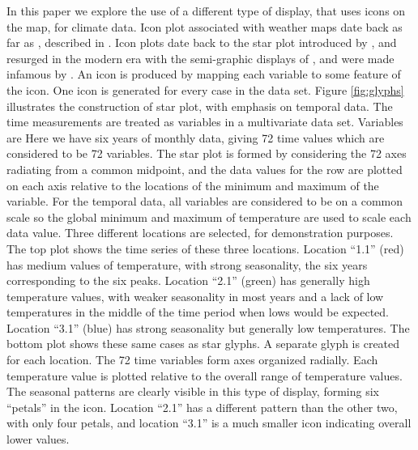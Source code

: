 \documentclass[oneside]{article}
\begin{document}
In this paper we explore the use of a different type of display, that uses icons on the map, for climate data.  Icon plot associated with weather maps date back as far as \citet{galton:weathermap}, described in \citet{friendlydenis:2001}. Icon plots date back to the star plot introduced by \citet{mayr:1877}, and resurged in the modern era with the semi-graphic displays of \citet{anderson:1960}, and were made infamous by \citep{chernoff:1973}. An icon is produced by mapping each variable to some feature of the icon. One icon is generated for every case in the data set. Figure \ref{fig:glyphs} illustrates the construction of star plot, with emphasis on temporal data. The time measurements are treated as variables in a multivariate data set. Variables are Here we have six years of monthly data, giving 72 time values which are considered to be 72 variables. The star plot is formed by considering the 72 axes radiating from a common midpoint, and the data values for the row are plotted on each axis relative to the locations of the minimum and maximum of the variable. For the temporal data, all variables are considered to be on a common scale so the global minimum and maximum of temperature are used to scale each data value. Three different locations are selected, for demonstration purposes. The top plot shows the time series of these three locations. Location ``1.1'' (red) has medium values of temperature, with strong seasonality, the six years corresponding to the six peaks. Location ``2.1'' (green) has generally high temperature values, with weaker seasonality in most years and a lack of low temperatures in the middle of the time period when lows would be expected. Location ``3.1'' (blue) has strong seasonality but generally low temperatures. The bottom plot shows these same cases as star glyphs. A separate glyph is created for each location. The 72 time variables form axes organized radially. Each temperature value is plotted relative to the overall range of temperature values. The seasonal patterns are clearly visible in this type of display, forming six ``petals'' in the icon. Location ``2.1'' has a different pattern than the other two, with only four petals, and location ``3.1'' is a much smaller icon indicating overall lower values. 
\end{document}

